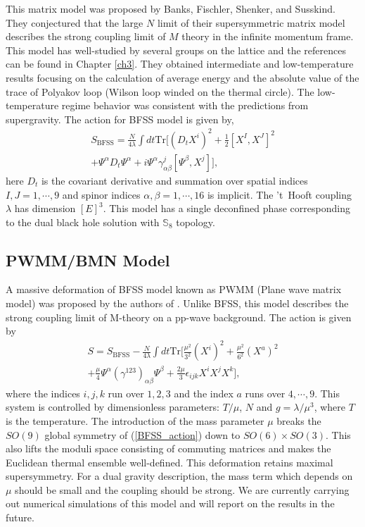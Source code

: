 This matrix model was proposed by Banks, Fischler, Shenker, and Susskind. They conjectured that the large $N$ limit of their 
supersymmetric matrix model describes the strong coupling limit of $M$ theory in the infinite momentum frame. 
This model has well-studied by several groups on the lattice and the references can be 
found in Chapter \ref{ch3}. They obtained intermediate and low-temperature results focusing on the 
calculation of average energy and the absolute value of the trace of Polyakov loop (Wilson loop winded on the thermal circle). 
The low-temperature regime behavior was consistent with the predictions from supergravity. 
The action for BFSS model is given by, 
\begin{align}
S_{\text{BFSS}} = \frac{N}{4\lambda} \int dt \mathrm{Tr} \Bigg[
  (D_t X^i)^2  + \frac{1}{2} \left[X^I,X^J\right]^2 \nonumber \\  +  \Psi^\alpha D_t \Psi^\alpha  
 + i \Psi^\alpha \gamma_{\alpha \beta}^j [\Psi^\beta,X^j] \Bigg],
\label{BFSS_action}
\end{align}
here $D_t$ is the covariant derivative and summation over spatial indices 
$I,J=1,\cdots,9$ and  spinor indices $\alpha,\beta=1,\cdots,16$ is implicit. 
The 't~Hooft coupling $\lambda$ has dimension $[E]^3$. 
This model has a single deconfined phase corresponding to the dual 
black hole solution with $\mathbb{S}_{8}$ topology. 


\subsection{PWMM/BMN Model}
A massive deformation of BFSS model known as 
PWMM (Plane wave matrix model) was proposed by the authors of \cite{Berenstein:2002jq}. 
Unlike BFSS, this model describes the strong coupling limit of M-theory on a pp-wave background. 
The action is given by
\begin{align}
S=S_{\text{BFSS}}-\frac{N}{4\lambda} \int dt \mathrm{Tr} \Bigg[
\frac{\mu^2}{ 3^2} ( X^i)^2 + \frac{\mu^2}{ 6^2} (X^a)^2 \nonumber \\ + \frac{\mu}{4}\Psi^\alpha \left(\gamma^{123}\right)_{\alpha \beta} \Psi^\beta 
+\frac{2\mu}{3} \epsilon_{ijk} X^iX^jX^k \Bigg] ,
\label{PWMM_action}
\end{align}
where the indices $i,j,k$ run over $1,2,3$ and the index $a$ runs over $4,\cdots,9$.
This system is controlled by dimensionless parameters: $T/\mu$, $N$ and $ g=\lambda/\mu^3$, where $T$ is the temperature.
The introduction of the mass parameter $\mu$ breaks the $SO(9)$ global symmetry of (\ref{BFSS_action}) down to $SO(6)\times SO(3)$. This also lifts the moduli space consisting of commuting matrices and makes the 
Euclidean thermal ensemble well-defined. This deformation retains maximal supersymmetry. For a 
dual gravity description, the mass term which depends on $\mu$ should be small and the coupling should be strong. 
We are currently carrying out numerical simulations of this model and will report on the results in the future. 



